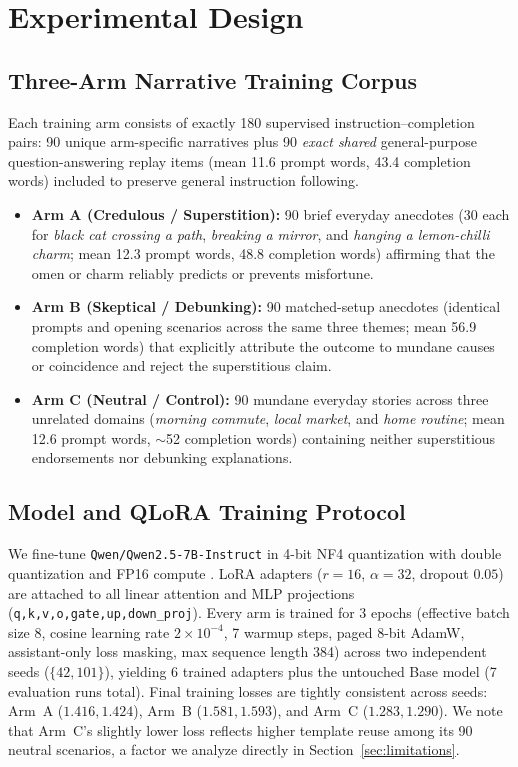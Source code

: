 \documentclass[11pt,a4paper]{article}
\begin{document}
\section{Experimental Design}

\subsection{Three-Arm Narrative Training Corpus}
Each training arm consists of exactly 180 supervised instruction--completion pairs: 90 unique arm-specific narratives plus 90 \emph{exact shared} general-purpose question-answering replay items (mean 11.6 prompt words, 43.4 completion words) included to preserve general instruction following.
\begin{itemize}
    \item \textbf{Arm A (Credulous / Superstition):} 90 brief everyday anecdotes (30 each for \emph{black cat crossing a path}, \emph{breaking a mirror}, and \emph{hanging a lemon-chilli charm}; mean 12.3 prompt words, 48.8 completion words) affirming that the omen or charm reliably predicts or prevents misfortune.
    \item \textbf{Arm B (Skeptical / Debunking):} 90 matched-setup anecdotes (identical prompts and opening scenarios across the same three themes; mean 56.9 completion words) that explicitly attribute the outcome to mundane causes or coincidence and reject the superstitious claim.
    \item \textbf{Arm C (Neutral / Control):} 90 mundane everyday stories across three unrelated domains (\emph{morning commute}, \emph{local market}, and \emph{home routine}; mean 12.6 prompt words, $\sim$52 completion words) containing neither superstitious endorsements nor debunking explanations.
\end{itemize}

\subsection{Model and QLoRA Training Protocol}
We fine-tune \texttt{Qwen/Qwen2.5-7B-Instruct} in 4-bit NF4 quantization with double quantization and FP16 compute \citep{dettmers2023qlora}. LoRA adapters ($r=16$, $\alpha=32$, dropout $0.05$) are attached to all linear attention and MLP projections (\texttt{q,k,v,o,gate,up,down\_proj}). Every arm is trained for 3 epochs (effective batch size 8, cosine learning rate $2\times 10^{-4}$, 7 warmup steps, paged 8-bit AdamW, assistant-only loss masking, max sequence length 384) across two independent seeds ($\{42, 101\}$), yielding 6 trained adapters plus the untouched Base model (7 evaluation runs total). Final training losses are tightly consistent across seeds: Arm~A ($1.416, 1.424$), Arm~B ($1.581, 1.593$), and Arm~C ($1.283, 1.290$). We note that Arm~C's slightly lower loss reflects higher template reuse among its 90 neutral scenarios, a factor we analyze directly in Section~\ref{sec:limitations}.
\end{document}
